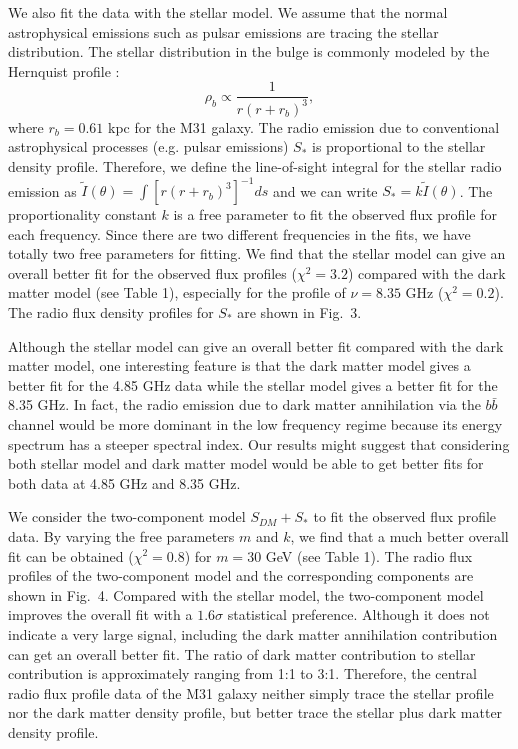 \documentclass[useAMS,usenatbib]{mn2e}
\begin{document}
We also fit the data with the stellar model. We assume that the normal astrophysical emissions such as pulsar emissions are tracing the stellar distribution. The stellar distribution in the bulge is commonly modeled by the Hernquist profile \citep{Sadoun}:
\begin{equation}
\rho_b \propto \frac{1}{r(r+r_b)^3},
\end{equation}
where $r_b=0.61$ kpc for the M31 galaxy. The radio emission due to conventional astrophysical processes (e.g. pulsar emissions) $S_*$ is proportional to the stellar density profile. Therefore, we define the line-of-sight integral for the stellar radio emission as $\tilde{I}(\theta)=\int [r(r+r_b)^3]^{-1}ds$ and we can write $S_*=k\tilde{I}(\theta)$. The proportionality constant $k$ is a free parameter to fit the observed flux profile for each frequency. Since there are two different frequencies in the fits, we have totally two free parameters for fitting. We find that the stellar model can give an overall better fit for the observed flux profiles ($\chi^2=3.2$) compared with the dark matter model (see Table 1), especially for the profile of $\nu=8.35$ GHz ($\chi^2=0.2$). The radio flux density profiles for $S_*$ are shown in Fig.~3. 

Although the stellar model can give an overall better fit compared with the dark matter model, one interesting feature is that the dark matter model gives a better fit for the 4.85 GHz data while the stellar model gives a better fit for the 8.35 GHz. In fact, the radio emission due to dark matter annihilation via the $b\bar{b}$ channel would be more dominant in the low frequency regime because its energy spectrum has a steeper spectral index. Our results might suggest that considering both stellar model and dark matter model would be able to get better fits for both data at 4.85 GHz and 8.35 GHz.

We consider the two-component model $S_{DM}+S_*$ to fit the observed flux profile data. By varying the free parameters $m$ and $k$, we find that a much better overall fit can be obtained ($\chi^2=0.8$) for $m=30$ GeV (see Table 1). The radio flux profiles of the two-component model and the corresponding components are shown in Fig.~4. Compared with the stellar model, the two-component model improves the overall fit with a $1.6 \sigma$ statistical preference. Although it does not indicate a very large signal, including the dark matter annihilation contribution can get an overall better fit. The ratio of dark matter contribution to stellar contribution is approximately ranging from 1:1 to 3:1. Therefore, the central radio flux profile data of the M31 galaxy neither simply trace the stellar profile nor the dark matter density profile, but better trace the stellar plus dark matter density profile.  
\end{document}
